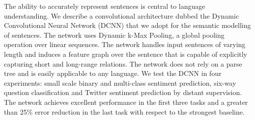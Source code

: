 The ability to accurately represent sentences is central to language understanding. We describe a convolutional architecture dubbed the Dynamic Convolutional Neural Network (DCNN) that we adopt for the semantic modelling of sentences. The network uses Dynamic k-Max Pooling, a global pooling operation over linear sequences. The network handles input sentences of varying length and induces a feature graph over the sentence that  is capable of explicitly capturing short and long-range relations. The network does not rely on a parse tree and is easily applicable to any language. We test the DCNN in four experiments: small scale binary and multi-class sentiment prediction, six-way question classification and Twitter sentiment prediction by distant supervision. The network achieves excellent performance in the first three tasks and a greater than 25\% error reduction in the last task with respect to the strongest baseline.

